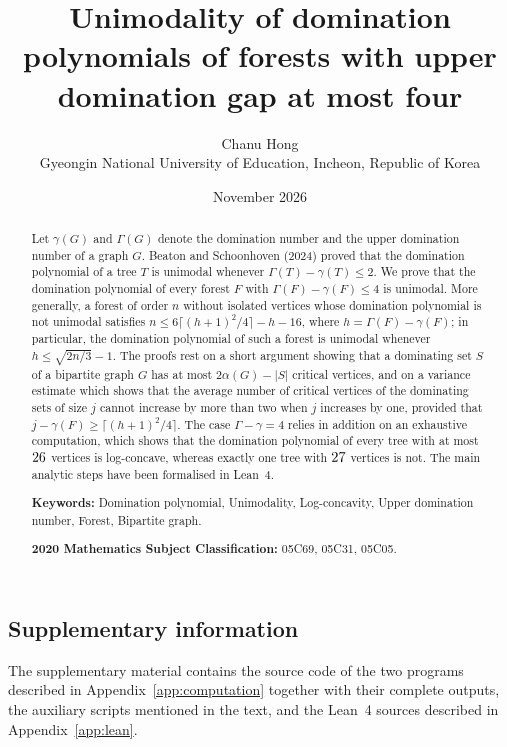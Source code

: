 \documentclass[11pt,a4paper]{article}
\title{Unimodality of domination polynomials of forests with upper domination gap at most four}
\author{Chanu Hong\\{\normalsize Gyeongin National University of Education, Incheon, Republic of Korea}\\{\normalsize \texttt{\AuthorEmail}}}
\date{November 2026}
\theoremstyle{definition}
\begin{document}
\maketitle

\begin{abstract}
Let $\gamma(G)$ and $\Gamma(G)$ denote the domination number and the upper
domination number of a graph $G$. Beaton and Schoonhoven (2024) proved that the
domination polynomial of a tree $T$ is unimodal whenever
$\Gamma(T)-\gamma(T)\le2$. We prove that the domination polynomial of every
forest $F$ with $\Gamma(F)-\gamma(F)\le4$ is unimodal. More generally, a
forest of order $n$ without isolated vertices whose domination polynomial is
not unimodal satisfies $n\le6\lceil(h+1)^2/4\rceil-h-16$, where
$h=\Gamma(F)-\gamma(F)$; in particular, the domination polynomial of such a
forest is unimodal whenever $h\le\sqrt{2n/3}-1$. The proofs rest on a short argument showing that
a dominating set $S$ of a bipartite graph $G$ has at most $2\alpha(G)-|S|$
critical vertices, and on a variance estimate which shows that the average
number of critical vertices of the dominating sets of size $j$ cannot
increase by more than two when $j$ increases by one, provided that
$j-\gamma(F)\ge\lceil(h+1)^2/4\rceil$. The case
$\Gamma-\gamma=4$ relies in addition on an exhaustive computation, which shows
that the domination polynomial of every tree with at most $26$ vertices is
log-concave, whereas exactly one tree with $27$ vertices is not. The main analytic steps have been formalised in Lean~4.

\medskip\noindent\textbf{Keywords:} Domination polynomial, Unimodality, Log-concavity, Upper domination number, Forest, Bipartite graph.

\noindent\textbf{2020 Mathematics Subject Classification:} 05C69, 05C31, 05C05.
\end{abstract}




\subsection*{Supplementary information}
The supplementary material contains the source code of the two programs
described in Appendix~\ref{app:computation} together with their complete
outputs, the auxiliary scripts mentioned in the text, and the Lean~4 sources
described in Appendix~\ref{app:lean}.

\begin{appendices}

\end{appendices}
\end{document}
